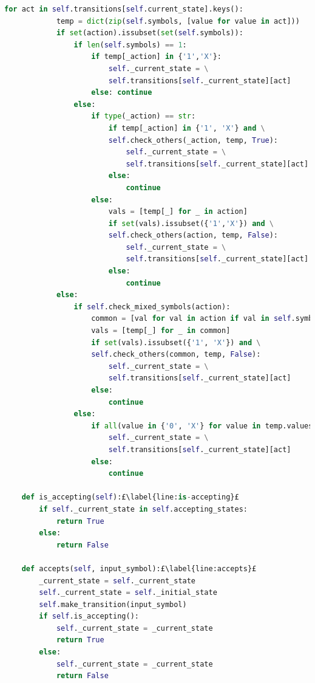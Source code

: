 \begin{lstlisting}[language=Python, style=Python, escapechar = £, label={code:janus-automa}, caption={The \texttt{automa.py} module}]
        for act in self.transitions[self.current_state].keys():
            temp = dict(zip(self.symbols, [value for value in act]))
            if set(action).issubset(set(self.symbols)):
                if len(self.symbols) == 1:
                    if temp[_action] in {'1','X'}:
                        self._current_state = \
                        self.transitions[self._current_state][act]
                    else: continue
                else: 
                    if type(_action) == str:
                        if temp[_action] in {'1', 'X'} and \
                        self.check_others(_action, temp, True):
                            self._current_state = \
                            self.transitions[self._current_state][act]
                        else:
                            continue
                    else:
                        vals = [temp[_] for _ in action]
                        if set(vals).issubset({'1','X'}) and \
                        self.check_others(action, temp, False):
                            self._current_state = \
                            self.transitions[self._current_state][act]
                        else:
                            continue
            else:
                if self.check_mixed_symbols(action):
                    common = [val for val in action if val in self.symbols]
                    vals = [temp[_] for _ in common] 
                    if set(vals).issubset({'1', 'X'}) and \
                    self.check_others(common, temp, False):
                        self._current_state = \
                        self.transitions[self._current_state][act]
                    else:
                        continue
                else:
                    if all(value in {'0', 'X'} for value in temp.values()):
                        self._current_state = \
                        self.transitions[self._current_state][act]
                    else:
                        continue

    def is_accepting(self):£\label{line:is-accepting}£
        if self._current_state in self.accepting_states:
            return True
        else:
            return False

    def accepts(self, input_symbol):£\label{line:accepts}£
        _current_state = self._current_state
        self._current_state = self._initial_state
        self.make_transition(input_symbol)
        if self.is_accepting():
            self._current_state = _current_state
            return True
        else:
            self._current_state = _current_state
            return False
\end{lstlisting}
